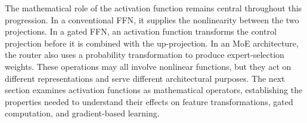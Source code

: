 The mathematical role of the activation function remains central
throughout this progression. In a conventional FFN, it supplies the
nonlinearity between the two projections. In a gated FFN, an
activation function transforms the control projection before it is
combined with the up-projection. In an MoE architecture, the router
also uses a probability transformation to produce expert-selection
weights. These operations may all involve nonlinear functions, but
they act on different representations and serve different
architectural purposes. The next section examines activation
functions as mathematical operators, establishing the properties
needed to understand their effects on feature transformations,
gated computation, and gradient-based learning.
